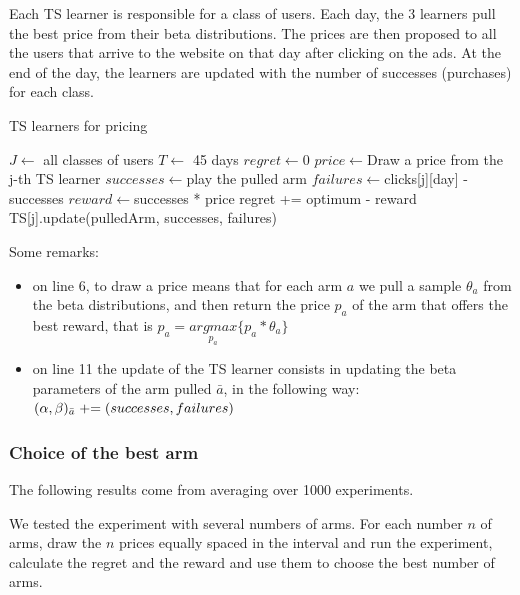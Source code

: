 Each TS learner is responsible for a class of users. Each day, the 3 learners pull the best price from their beta distributions. The prices are then proposed to all the users that arrive to the website on that day after clicking on the ads. At the end of the day, the learners are updated with the number of successes (purchases) for each class.

\begin{algorithm}
    \caption{TS learners for pricing}
    \label{alg:ts_pricing}
	\begin{algorithmic}[1]
        \STATE $J\gets ${ all classes of users}
        \STATE $T\gets ${ 45 days }
        \STATE $regret\gets ${0}
		\STATE $price\gets ${Draw a price from the j-th TS learner}
        \STATE $successes\gets ${play the pulled arm}
        \STATE $failures\gets ${clicks[j][day] - successes}
        \STATE $reward\gets ${successes * price}
        \STATE regret += optimum - reward
        \STATE TS[j].update(pulledArm, successes, failures)
        \ENDFOR
        \ENDFOR
	\end{algorithmic}
\end{algorithm}

Some remarks:
\begin{itemize}
    \item on line 6, to draw a price means that for each arm $a$ we pull a sample $\theta_a$ from the beta distributions, and then return the price $p_a$ of the arm that offers the best reward, that is $p_a = \underset{p_a}{argmax} \{p_a * \theta_a\}$
    \item on line 11 the update of the TS learner consists in updating the beta parameters of the arm pulled $\bar{a}$, in the following way: $(\alpha, \beta)_{\bar{a}} \mathrel{+}= (successes, failures)$
\end{itemize}

\subsubsection{Choice of the best arm}
The following results come from averaging over 1000 experiments.

We tested the experiment with several numbers of arms. For each number $n$ of arms, draw the $n$ prices equally spaced in the interval and run the experiment, calculate the regret and the reward and use them to choose the best number of arms.

